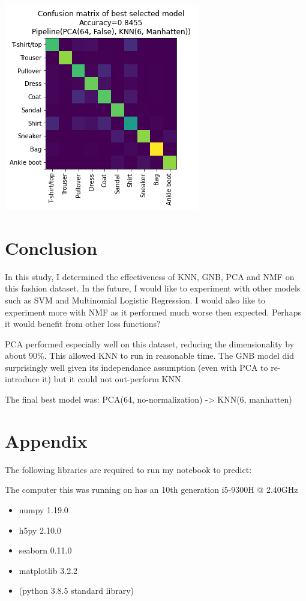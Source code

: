 \documentclass[11pt]{article}
\begin{document}
\begin{center}
\includegraphics[width=.9\linewidth]{.images/Experimentation_and_Results/2020-10-21_22-15-36_screenshot.png}
\end{center}


\section{Conclusion}
\label{sec:org7239f13}

In this study, I determined the effectiveness of KNN, GNB, PCA and NMF on this fashion dataset. In the future, I would like to experiment with other models such as SVM and Multinomial Logistic Regression. I would also like to experiment more with NMF as it performed much worse then expected. Perhaps it would benefit from other loss functions?

PCA performed especially well on this dataset, reducing the dimensionality by about 90\%. This allowed KNN to run in reasonable time. The GNB model did surprisingly well given its independance assumption (even with PCA to re-introduce it) but it could not out-perform KNN.

The final best model was:
PCA(64, no-normalization) -> KNN(6, manhatten)

\section{Appendix}
\label{sec:org897e736}
The following libraries are required to run my notebook to predict:

The computer this was running on has an 10th generation i5-9300H @ 2.40GHz

\begin{itemize}
\item numpy 1.19.0
\item h5py 2.10.0
\item seaborn 0.11.0
\item matplotlib 3.2.2
\item (python 3.8.5 standard library)
\end{itemize}
\end{document}
